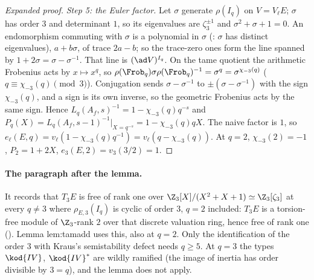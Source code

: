 \begin{sloppypar}
\begin{proof}[Expanded proof]
\emph{Step 5: the Euler factor.} Let $\sigma$ generate $\rho(I_q)$ on $V=V_\ell E$; $\sigma$ has order $3$ and determinant $1$, so its eigenvalues are $\zeta_3^{\pm1}$ and $\sigma^2+\sigma+1=0$.
An endomorphism commuting with $\sigma$ is a polynomial in $\sigma$ (: $\sigma$ has distinct eigenvalues), $a+b\sigma$, of trace $2a-b$; so the trace-zero ones
form the line spanned by $1+2\sigma=\sigma-\sigma^{-1}$. That line is $(\ad V)^{I_q}$. On the tame quotient the arithmetic Frobenius acts by $x\mapsto x^q$, so
$\rho(\Frob_q)\sigma\rho(\Frob_q)^{-1}=\sigma^q=\sigma^{\chi_{-3}(q)}$ ($q\equiv\chi_{-3}(q)\pmod3$). Conjugation sends $\sigma-\sigma^{-1}$ to $\pm(\sigma-\sigma^{-1})$ with the sign $\chi_{-3}(q)$, and a sign
is its own inverse, so the geometric Frobenius acts by the same sign. Hence $L_q(A_f,s)^{-1}=1-\chi_{-3}(q)q^{-s}$ and $P_q(X)=L_q(A_f,s-1)^{-1}|_{X=q^{-s}}=1-\chi_{-3}(q)qX$. The naive factor
is $1$, so $e_\ell(E,q)=v_\ell(1-\chi_{-3}(q)q^{-1})=v_\ell(q-\chi_{-3}(q))$. At $q=2$, $\chi_{-3}(2)=-1$, $P_2=1+2X$, $e_3(E,2)=v_3(3/2)=1$.
\end{proof}

\paragraph{The paragraph after the lemma.} It records that $T_3E$ is free of rank one over $\Z_3[X]/(X^2+X+1)\simeq\Z_3[\zeta_3]$ at every $q\ne3$ where $\rho_{E,3}(I_q)$ is
cyclic of order $3$, $q=2$ included: $T_3E$ is a torsion-free module of $\Z_3$-rank $2$ over that discrete valuation ring, hence free of rank one (). Lemma
lem:tamadd uses this, also at $q=2$. Only the identification of the order $3$ with Kraus's semistability defect needs $q\ge5$. At $q=3$ the types $\kod{IV}$, $\kod{IV}^*$
are wildly ramified (the image of inertia has order divisible by $3=q$), and the lemma does not apply.


\end{sloppypar}
